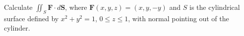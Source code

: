 \documentclass[openany]{book}
\begin{document}
\begin{prob}[26]
    Calculate \( \iint_S \mathbf{F} \cdot d\mathbf{S} \), where \( \mathbf{F}(x, y, z) = (x, y, -y) \) and \( S \) is the cylindrical surface defined by \( x^2 + y^2 = 1 \), \( 0 \leq z \leq 1 \), with normal pointing out of the cylinder.
\end{prob}
\end{document}
